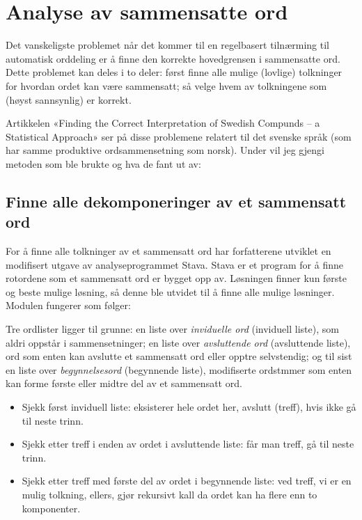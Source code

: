 \section{Analyse av sammensatte ord}
\label{sec:sammensatt-analyse}

Det vanskeligste problemet når det kommer til en regelbasert tilnærming til automatisk orddeling er å finne den korrekte hovedgrensen i sammensatte ord. Dette problemet kan deles i to deler: først finne alle mulige (lovlige) tolkninger for hvordan ordet kan være sammensatt; så velge hvem av tolkningene som (høyst sannsynlig) er korrekt.

 Artikkelen «Finding the Correct Interpretation of Swedish Compunds – a Statistical Approach»\cite{sjobergh2004finding} ser på disse problemene relatert til det svenske språk (som har samme produktive ordsammensetning som norsk). Under vil jeg gjengi metoden som ble brukte og hva de fant ut av:

\subsection{Finne alle dekomponeringer av et sammensatt ord}

For å finne alle tolkninger av et sammensatt ord har forfatterene utviklet en modifisert utgave av analyseprogrammet Stava. Stava er et program for å finne rotordene som et sammensatt ord er bygget opp av. Løsningen finner kun første og beste mulige løsning, så denne ble utvidet til å finne alle mulige løsninger. Modulen fungerer som følger: 

Tre ordlister ligger til grunne: en liste over \textit{inviduelle ord} (inviduell liste), som aldri oppstår i sammensetninger; en liste over \textit{avsluttende ord} (avsluttende liste), ord som enten kan avslutte et sammensatt ord eller opptre selvstendig; og til sist en liste over \textit{begynnelsesord} (begynnende liste), modifiserte ordstmmer som enten kan forme første eller midtre del av et sammensatt ord.

\begin{itemize}
\item Sjekk først inviduell liste: eksisterer hele ordet her, avslutt (treff), hvis ikke gå til neste trinn.
\item Sjekk etter treff i enden av ordet i avsluttende liste: får man treff, gå til neste trinn.
\item Sjekk etter treff med første del av ordet i begynnende liste: ved treff, vi er en mulig tolkning, ellers, gjør rekursivt kall da ordet kan ha flere enn to komponenter. 
\end{itemize}

